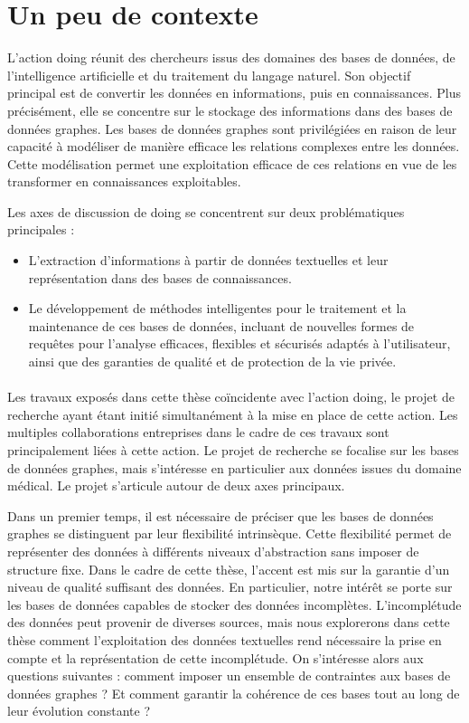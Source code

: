 \section{Un peu de contexte}

L'action \gls{doing} réunit des chercheurs issus des domaines des bases de données, de l'intelligence artificielle et du traitement du langage naturel.
Son objectif principal est de convertir les données en informations, puis en connaissances.
Plus précisément, elle se concentre sur le stockage des informations dans des bases de données graphes.
Les bases de données graphes sont privilégiées en raison de leur capacité à modéliser de manière efficace les relations complexes entre les données.
Cette modélisation permet une exploitation efficace de ces relations en vue de les transformer en connaissances exploitables.

Les axes de discussion de \gls{doing} se concentrent sur deux problématiques principales :
\begin{itemize}
    \item L'extraction d'informations à partir de données textuelles et leur représentation dans des bases de connaissances.
    \item Le développement de méthodes intelligentes pour le traitement et la maintenance de ces bases de données, incluant de nouvelles formes de requêtes pour l'analyse efficaces, flexibles et sécurisés adaptés à l'utilisateur, ainsi que des garanties de qualité et de protection de la vie privée.
\end{itemize}

\paragraph{}
Les travaux exposés dans cette thèse coïncidente avec l'action \gls{doing}, le projet de recherche ayant étant initié simultanément à la mise en place de cette action.
Les multiples collaborations entreprises dans le cadre de ces travaux sont principalement liées à cette action.
Le projet de recherche se focalise sur les bases de données graphes, mais s'intéresse en particulier aux données issues du domaine médical.
Le projet s'articule autour de deux axes principaux.

Dans un premier temps, il est nécessaire de préciser que les bases de données graphes se distinguent par leur flexibilité intrinsèque.
Cette flexibilité permet de représenter des données à différents niveaux d'abstraction sans imposer de structure fixe.
Dans le cadre de cette thèse, l'accent est mis sur la garantie d'un niveau de qualité suffisant des données.
En particulier, notre intérêt se porte sur les bases de données capables de stocker des données incomplètes.
L'incomplétude des données peut provenir de diverses sources, mais nous explorerons dans cette thèse comment l'exploitation des données textuelles rend nécessaire la prise en compte et la représentation de cette incomplétude.
On s'intéresse alors aux questions suivantes : comment imposer un ensemble de contraintes aux bases de données graphes ? Et comment garantir la cohérence de ces bases tout au long de leur évolution constante ?

